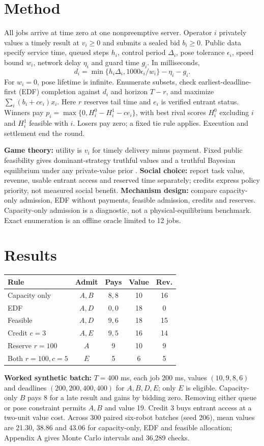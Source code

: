 \section{Method}
All jobs arrive at time zero at one nonpreemptive server. Operator $i$ privately values a timely result at $v_i\geq0$ and submits a sealed bid $b_i\geq0$. Public data specify service time, queued steps $h_i$, control period $\Delta_i$, pose tolerance $\epsilon_i$, speed bound $w_i$, network delay $\eta_i$ and guard time $g_i$. In milliseconds,
\[
d_i=\min\{h_i\Delta_i,1000\epsilon_i/w_i\}-\eta_i-g_i.
\]
For $w_i=0$, pose lifetime is infinite. Enumerate subsets, check earliest-deadline-first (EDF) completion against $d_i$ and horizon $T-r$, and maximize $\sum_i(b_i+ce_i)x_i$. Here $r$ reserves tail time and $e_i$ is verified entrant status. Winners pay $p_i=\max\{0,H_i^0-H_i^1-ce_i\}$, with best rival scores $H_i^0$ excluding $i$ and $H_i^1$ feasible with $i$. Losers pay zero; a fixed tie rule applies. Execution and settlement end the round.

\textbf{Game theory:} utility is $v_i$ for timely delivery minus payment. Fixed public feasibility gives dominant-strategy truthful values and a truthful Bayesian equilibrium under any private-value prior \cite{roughgarden,harsanyi}. \textbf{Social choice:} report task value, revenue, usable entrant access and reserved time separately; credits express policy priority, not measured social benefit. \textbf{Mechanism design:} compare capacity-only admission, EDF without payments, feasible admission, credits and reserves. Capacity-only admission is a diagnostic, not a physical-equilibrium benchmark. Exact enumeration is an offline oracle limited to 12 jobs.

\section{Results}
\begin{center}\small\setlength{\tabcolsep}{4pt}
\begin{tabular}{lcccc}\toprule
Rule & Admit & Pays & Value & Rev.\\\midrule
Capacity only & $A,B$ & $8,8$ & 10 & 16\\
EDF & $A,D$ & $0,0$ & 18 & 0\\
Feasible & $A,D$ & $9,6$ & 18 & 15\\
Credit $c=3$ & $A,E$ & $9,5$ & 16 & 14\\
Reserve $r=100$ & $A$ & 9 & 10 & 9\\
Both $r=100,c=5$ & $E$ & 5 & 6 & 5\\\bottomrule
\end{tabular}\end{center}
\noindent\textbf{Worked synthetic batch:} $T=400$ ms, each job 200 ms, values $(10,9,8,6)$ and deadlines $(200,200,400,400)$ for $A,B,D,E$; only $E$ is eligible. Capacity-only $B$ pays 8 for a late result and gains by bidding zero. Removing either queue or pose constraint permits $A,B$ and value 19. Credit 3 buys entrant access at a two-unit value cost. Across 300 paired six-robot batches (seed 206), mean values are 21.30, 38.86 and 43.06 for capacity-only, EDF and feasible allocation; Appendix A gives Monte Carlo intervals and 36,289 checks.

